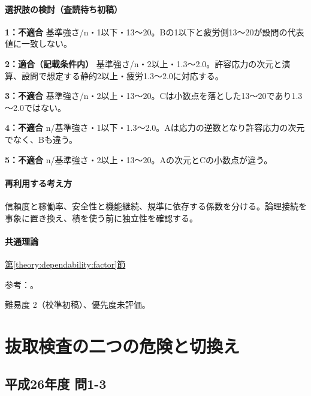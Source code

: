\paragraph{選択肢の検討（査読待ち初稿）}\mbox{}\par

\noindent\textbf{1：不適合} 基準強さ/n・1以下・13～20。Bの1以下と疲労側13～20が設問の代表値に一致しない。\par

\noindent\textbf{2：適合（記載条件内）} 基準強さ/n・2以上・1.3～2.0。許容応力の次元と演算、設問で想定する静的2以上・疲労1.3～2.0に対応する。\par

\noindent\textbf{3：不適合} 基準強さ/n・2以上・13～20。Cは小数点を落とした13～20であり1.3～2.0ではない。\par

\noindent\textbf{4：不適合} n/基準強さ・1以下・1.3～2.0。Aは応力の逆数となり許容応力の次元でなく、Bも違う。\par

\noindent\textbf{5：不適合} n/基準強さ・2以上・13～20。Aの次元とCの小数点が違う。\par

\paragraph{再利用する考え方} 信頼度と稼働率、安全性と機能継続、規準に依存する係数を分ける。論理接続を事象に置き換え、積を使う前に独立性を確認する。

\paragraph{共通理論} \hyperref[theory:dependability:factor]{第\ref*{theory:dependability:factor}節}

\par 参考：\cite{struct_mit_beam,struct_nims_data,design_faa_2011}。

\par 難易度 2（校準初稿）、優先度未評価。

\section{抜取検査の二つの危険と切換え}

\subsection{平成26年度 問1-3}
\label{q:h26-reg-basic-1-3}

